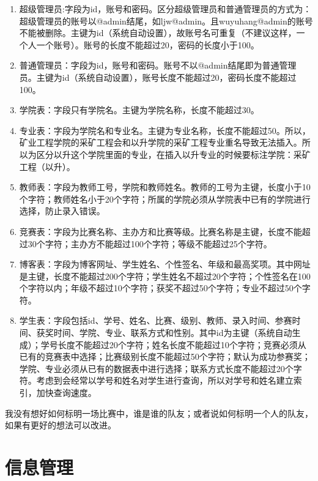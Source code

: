 \documentclass[lang=cn,hazy,screen,blue,14pt]{elegantnote}
\begin{document}
\begin{enumerate}
    \item 超级管理员:字段为id，账号和密码。区分超级管理员和普通管理员的方式为：超级管理员的账号以@admin结尾，如ljw@admin。且wuyuhang@admin的账号不能被删除。主键为id（系统自动设置），故账号名可重复（不建议这样，一个人一个账号）。账号的长度不能超过20，密码的长度小于100。
    \item 普通管理员：字段为id，账号和密码。账号不以@admin结尾即为普通管理员。主键为id（系统自动设置），账号长度不能超过20，密码长度不能超过100。
    \item 学院表：字段只有学院名。主键为学院名称，长度不能超过30。
    \item 专业表：字段为学院名和专业名。主键为专业名称，长度不能超过50。所以，矿业工程学院的采矿工程会和以升学院的采矿工程专业重名导致无法插入。所以为区分以升这个学院里面的专业，在插入以升专业的时候要标注学院：采矿工程（以升）。
    \item 教师表：字段为教师工号，学院和教师姓名。教师的工号为主键，长度小于10个字符；教师姓名小于20个字符；所属的学院必须从学院表中已有的学院进行选择，防止录入错误。
    \item 竞赛表：字段为比赛名称、主办方和比赛等级。比赛名称是主键，长度不能超过30个字符；主办方不能超过100个字符；等级不能超过25个字符。
    \item 博客表：字段为博客网址、学生姓名、个性签名、年级和最高奖项。其中网址是主键，长度不能超过200个字符；学生姓名不超过20个字符；个性签名在100个字符以内；年级不超过10个字符；获奖不超过50个字符；专业不超过50个字符。
    \item 学生表：字段包括id、学号、姓名、比赛、级别、教师、录入时间、参赛时间、获奖时间、学院、专业、联系方式和性别。其中id为主键（系统自动生成）；学号长度不能超过20个字符；姓名长度不能超过10个字符；竞赛必须从已有的竞赛表中选择；比赛级别长度不能超过50个字符；默认为成功参赛奖；学院、专业必须从已有的数据表中进行选择；联系方式长度不能超过20个字符。考虑到会经常以学号和姓名对学生进行查询，所以对学号和姓名建立索引，加快查询速度。
\end{enumerate}

\begin{note}
我没有想好如何标明一场比赛中，谁是谁的队友；或者说如何标明一个人的队友，如果有更好的想法可以改进。
\end{note}

\section{信息管理}
\end{document}
